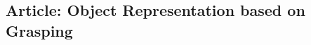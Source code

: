 \documentclass[a4paper,11pt,pdf]{pacmanreport}
\begin{document}
\subsection{Article: Object Representation based on Grasping}
\label{ann:wacv}


\end{document}
